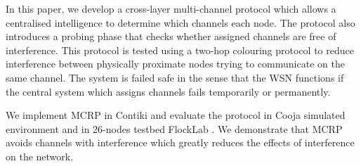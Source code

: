 
In this paper, we develop a cross-layer multi-channel protocol which allows a centralised intelligence to determine which channels each node. The protocol also introduces a probing phase that checks whether assigned channels are free of interference. This protocol is tested using a two-hop colouring protocol to reduce interference between physically proximate nodes trying to communicate on the same channel. The system is failed safe in the sense that the WSN functions if the central system which assigns channels fails temporarily or permanently.

We implement MCRP in Contiki and evaluate the protocol in Cooja simulated environment and in 26-nodes testbed FlockLab \cite{flocklab}. We demonstrate that MCRP avoids channels with interference which greatly reduces the effects of interference on the network.






